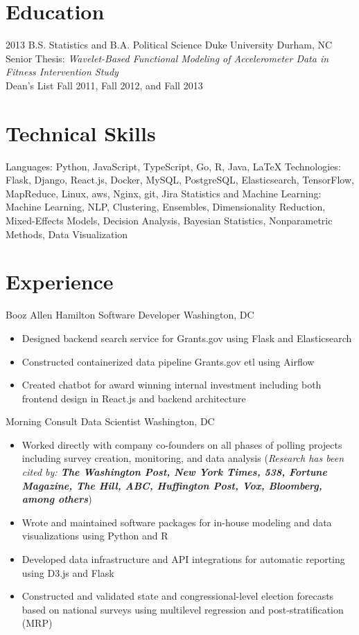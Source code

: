 \documentclass[11pt,a4paper,sans]{moderncv}        %
\begin{document}
\makecvtitle\vspace{-6ex}                          %

\section{Education}
\cventry
	{2013}
	{B.S. Statistics and B.A. Political Science}
	{Duke University}
	{Durham, NC}
	{}
	{Senior Thesis: \textit{Wavelet-Based Functional Modeling of Accelerometer Data in Fitness Intervention Study}
	\\Dean's List Fall 2011, Fall 2012, and Fall 2013}

\section{Technical Skills}
\cvitem
  {Languages:}
  {Python, JavaScript, TypeScript, Go, R, Java, \LaTeX}
\cvitem
  {Technologies:}
  {Flask, Django, React.js, Docker, MySQL, PostgreSQL, Elasticsearch, TensorFlow, MapReduce, Linux, aws, Nginx, git, Jira}
\cvitem
  {Statistics and Machine Learning:}
  {Machine Learning, NLP, Clustering, Ensembles, Dimensionality Reduction, Mixed-Effects Models, Decision Analysis, Bayesian Statistics, Nonparametric Methods, Data Visualization}

\section{Experience}
  {Booz Allen Hamilton Software Developer}
  {}
  {Washington, DC}
  {}
  {
    \begin{itemize}
		\item{Designed backend search service for Grants.gov using Flask and Elasticsearch}
 		\item{Constructed containerized data pipeline Grants.gov etl using Airflow}
		\item{Created chatbot for award winning internal investment including both frontend design in React.js and backend architecture}
    \end{itemize}
  }

  {Morning Consult Data Scientist}
  {}
  {Washington, DC}
  {}
  {
    \begin{itemize}
		\item{Worked directly with company co-founders on all phases of polling projects including survey creation, monitoring, and data analysis (\textit{Research has been cited by: \textbf{The Washington Post, New York Times, 538, Fortune Magazine, The Hill, ABC, Huffington Post, Vox, Bloomberg, among others}})}
 		\item{Wrote and maintained software packages for in-house modeling and data visualizations using Python and R}
		\item{Developed data infrastructure and API integrations for automatic reporting using D3.js and Flask}
		\item{Constructed and validated state and congressional-level election forecasts based on national surveys using multilevel regression and post-stratification (MRP)}
    \end{itemize}
  }
\end{document}
